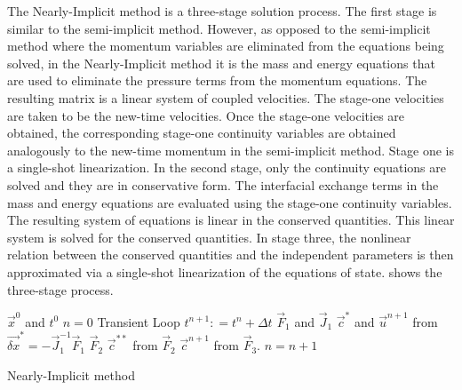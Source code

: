 The Nearly-Implicit method is a three-stage solution process.
The first stage is similar to the semi-implicit method.
However, as opposed to the semi-implicit method where the momentum variables are eliminated from the equations being solved, in the Nearly-Implicit method it is the mass and energy equations that are used to eliminate the pressure terms from the momentum equations.
The resulting matrix is a linear system of coupled velocities.
The stage-one velocities are taken to be the new-time velocities.
Once the stage-one velocities are obtained, the corresponding stage-one continuity variables are obtained analogously to the new-time momentum in the semi-implicit method.
Stage one is a single-shot linearization.
In the second stage, only the continuity equations are solved and they are in conservative form.
The interfacial exchange terms in the mass and energy equations are evaluated using the stage-one continuity variables.
The resulting system of equations is linear in the conserved quantities.
This linear system is solved for the conserved quantities.
In stage three, the nonlinear relation between the conserved quantities and the independent parameters is then approximated via a single-shot linearization of the equations of state.
 shows the three-stage process.

\begin{algo}[H]
\setlength{\baselineskip}{0.625\baselineskip}
\begin{algorithmic}[1]
\Require $\vec{x}^{0}$ and $t^{0}$
\Set $n = 0$
\Loop \; Transient Loop
    \State $t^{n+1} : = t^{n} + \Delta t$
	\Calculate $\vec{F}_1$ and $\vec{J}_1$
	\Calculate $\vec{c}^{*}$ and $\vec{u}^{n+1}$ from $\vec{\delta x}^{*} = -\vec{J}^{-1}_1\vec{F}_1$
	\Calculate $\vec{F}_2$
	\Calculate $\vec{c}^{**}$ from $\vec{F}_2$
	\Calculate $\vec{c}^{n+1}$ from $\vec{F}_3$.
	\State $n = n + 1$
\EndLoop
\end{algorithmic}
\caption{Nearly-Implicit method}
\label{alg:ni}
\end{algo}

